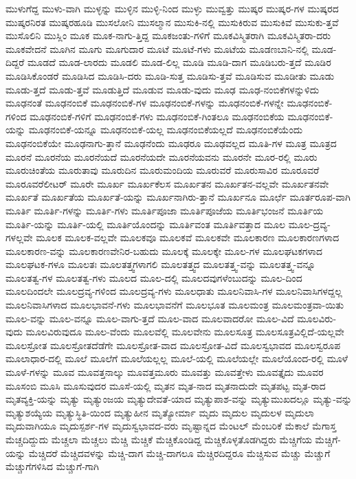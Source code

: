 {ಮುಳುಗೆದ್ದ
ಮುಳು-ವಾಗಿ
ಮುಳ್ಳನ್ನು
ಮುಳ್ಳಿನ
ಮುಳ್ಳಿ-ನಿಂದ
ಮುಳ್ಳು
ಮುವ್ವತ್ತು
ಮುಷ್ಕರ
ಮುಷ್ಕರ-ಗಳ
ಮುಷ್ಕರದ
ಮುಷ್ಕರನಿರತ
ಮುಷ್ಕರಹೂಡಿ
ಮುಸಲೋನಿ
ಮುಸಲ್ಮಾನ
ಮುಸುಕಿ-ನಲ್ಲಿ
ಮುಸುಕಿರುವ
ಮುಸುಕಿವೆ
ಮುಸುಕು-ತ್ತವೆ
ಮುಸೊಲಿನಿ
ಮುಸ್ಲಿಂ
ಮೂಕ
ಮೂಕ-ನಾಗು-ತ್ತಿದ್ದ
ಮೂಕಜಂತು-ಗಳಿಗೆ
ಮೂಕವಿಸ್ಮಿತರಾಗಿ
ಮೂಕವಿಸ್ಮಿತರಾ-ದರು
ಮೂಕವೇದನೆ
ಮೂಗಿನ
ಮೂಗು
ಮೂಗುದಾರ
ಮೂಟೆ
ಮೂಟೆ-ಗಳು
ಮೂಟೆಯ
ಮೂಡಣಬಾನಿ-ನಲ್ಲಿ
ಮೂಡ-ದಿದ್ದರೆ
ಮೂಡದೆ
ಮೂಡ-ಲಾರದು
ಮೂಡಲಿ
ಮೂಡ-ಲಿಲ್ಲ
ಮೂಡಿ
ಮೂಡಿ-ದಾಗ
ಮೂಡಿಬರು-ತ್ತದೆ
ಮೂಡಿರ
ಮೂಡಿಸಿಕೊಂಡರೆ
ಮೂಡಿಸಿದ
ಮೂಡಿಸಿ-ದರು
ಮೂಡಿ-ಸುತ್ತ
ಮೂಡಿಸು-ತ್ತವೆ
ಮೂಡಿಸುವ
ಮೂಡೀತು
ಮೂಡು
ಮೂಡು-ತ್ತದೆ
ಮೂಡು-ತ್ತವೆ
ಮೂಡುತ್ತಿದೆ
ಮೂಡುವ
ಮೂಡು-ವುದು
ಮೂಢ
ಮೂಢ-ನಂಬಿಕೆಗಳನ್ನುಳಿದು
ಮೂಢನಂತೆ
ಮೂಢನಂಬಿಕೆ
ಮೂಢನಂಬಿಕೆ-ಗಳ
ಮೂಢನಂಬಿಕೆ-ಗಳನ್ನು
ಮೂಢನಂಬಿಕೆ-ಗಳನ್ನೇ
ಮೂಢನಂಬಿಕೆ-ಗಳಿಂದ
ಮೂಢನಂಬಿಕೆ-ಗಳಿಗೆ
ಮೂಢನಂಬಿಕೆ-ಗಳು
ಮೂಢನಂಬಿಕೆ-ಗಿಂತಲೂ
ಮೂಢನಂಬಿಕೆಯ
ಮೂಢನಂಬಿಕೆ-ಯನ್ನು
ಮೂಢನಂಬಿಕೆ-ಯನ್ನೂ
ಮೂಢನಂಬಿಕೆ-ಯಲ್ಲ
ಮೂಢನಂಬಿಕೆಯಲ್ಲದೆ
ಮೂಢನಂಬಿಕೆಯೆಂದು
ಮೂಢನಂಬಿಕೆಯೇ
ಮೂಢನಾಗು-ತ್ತಾನೆ
ಮೂಢನೆಂದು
ಮೂಢರೂ
ಮೂಢವಲ್ಲದ
ಮೂತಿ-ಗಳ
ಮೂತ್ರ
ಮೂತ್ರದ
ಮೂರನೆ
ಮೂರನೆಯ
ಮೂರನೆಯದೆ
ಮೂರನೆಯದೇ
ಮೂರನೆಯವನು
ಮೂರನೇ
ಮೂರ-ರಲ್ಲಿ
ಮೂರು
ಮೂರುಚಿಂತೆಯ
ಮೂರುತಾವು
ಮೂರುದಿನ
ಮೂರುಮಂದಿಯ
ಮೂರುವರೆ
ಮೂರುಸಾವಿರ
ಮೂರೂವರೆ
ಮೂರೂವರೆಲೀಟರ್
ಮೂರೇ
ಮೂರ್ಖ
ಮೂರ್ಖಕೆಲಸ
ಮೂರ್ಖತನ
ಮೂರ್ಖತನ-ವಲ್ಲವೇ
ಮೂರ್ಖತನವೇ
ಮೂರ್ಖತೆ
ಮೂರ್ಖತೆಯ
ಮೂರ್ಖತೆ-ಯನ್ನು
ಮೂರ್ಖನಾಗಿರು-ತ್ತಾನೆ
ಮೂರ್ಖನೂ
ಮೂರ್ಛೆ
ಮೂರ್ತರೂಪ-ವಾಗಿ
ಮೂರ್ತಿ
ಮೂರ್ತಿ-ಗಳನ್ನು
ಮೂರ್ತಿ-ಗಳು
ಮೂರ್ತಿಪೂಜಾ
ಮೂರ್ತಿಪೂಜೆಯ
ಮೂರ್ತಿಭಂಜನೆ
ಮೂರ್ತಿಯ
ಮೂರ್ತಿ-ಯನ್ನು
ಮೂರ್ತಿ-ಯಲ್ಲಿ
ಮೂರ್ತಿಯೊಂದನ್ನು
ಮೂರ್ತಿವಂತ
ಮೂರ್ತಿವತ್ತಾದ
ಮೂಲ
ಮೂಲ-ದ್ರವ್ಯ-ಗಳಲ್ಲವೇ
ಮೂಲಕ
ಮೂಲಕ-ವಲ್ಲವೇ
ಮೂಲಕವೂ
ಮೂಲಕವೆ
ಮೂಲಕವೇ
ಮೂಲಕಾರಣ
ಮೂಲಕಾರಣಗಳಾದ
ಮೂಲಕಾರಣ-ವನ್ನು
ಮೂಲಕಾರಣವೇನಿರ-ಬಹುದು
ಮೂಲಕ್ಕೆ
ಮೂಲಕ್ಕೇ
ಮೂಲ-ಗಳ
ಮೂಲಘಟಕಗಳಾದ
ಮೂಲಘಟಕ-ಗಳೂ
ಮೂಲತಃ
ಮೂಲತತ್ತ್ವಗಳಾಗಲಿ
ಮೂಲತತ್ತ್ವದ
ಮೂಲತತ್ತ್ವ-ವನ್ನು
ಮೂಲತತ್ತ್ವ-ವನ್ನೂ
ಮೂಲತತ್ವ-ಗಳ
ಮೂಲತತ್ವ-ಗಳು
ಮೂಲದ
ಮೂಲ-ದಲ್ಲಿ
ಮೂಲದವುಗಳೆಂಬುದನ್ನು
ಮೂಲ-ದಿಂದ
ಮೂಲದಿಂದಲೇ
ಮೂಲದ್ರವ್ಯ-ಗಳಿಂದ
ಮೂಲದ್ರವ್ಯ-ಗಳು
ಮೂಲಧಾತು
ಮೂಲನಿವಾಸಿ-ಗಳ
ಮೂಲನಿವಾಸಿಗಳದ್ದಲ್ಲ
ಮೂಲನಿವಾಸಿಗಳಾದ
ಮೂಲಭಾವನೆ-ಗಳು
ಮೂಲಭಾವನೆಗೆ
ಮೂಲಭೂತ
ಮೂಲಮಂತ್ರ
ಮೂಲಮಂತ್ರವಾ-ಯಿತು
ಮೂಲ-ವನ್ನು
ಮೂಲ-ವನ್ನೂ
ಮೂಲ-ವಾಗು-ತ್ತದೆ
ಮೂಲ-ವಾದ
ಮೂಲವಾದರೋ
ಮೂಲ-ವಿದೆ
ಮೂಲವಿರು-ವುದು
ಮೂಲವಿರುವುದೂ
ಮೂಲ-ವೆಂದು
ಮೂಲವೆಲ್ಲಿ
ಮೂಲವೇನು
ಮೂಲಸೂತ್ರ
ಮೂಲಸೂತ್ರವಿಲ್ಲಿದೆ-ಯಲ್ಲವೇ
ಮೂಲಸ್ರೋತ
ಮೂಲಸ್ರೋತದೆಡೆಗೇ
ಮೂಲಸ್ರೋತ-ವಾದ
ಮೂಲಸ್ರೋತ-ವಿದೆ
ಮೂಲಸ್ವಭಾವದ
ಮೂಲಸ್ವರೂಪ
ಮೂಲಾಧಾರ-ದಲ್ಲಿ
ಮೂಲೆ
ಮೂಲೆಗೆ
ಮೂಲೆಯಲ್ಲಲ್ಲ
ಮೂಲೆ-ಯಲ್ಲಿ
ಮೂಲೆಯಲ್ಲೇ
ಮೂಲೆಯೊಂದ-ರಲ್ಲಿ
ಮೂಳೆ
ಮೂಳೆ-ಗಳನ್ನು
ಮೂವ
ಮೂವತ್ತನಾಲ್ಕು
ಮೂವತ್ತಮೂರು
ಮೂವತ್ತು
ಮೂವತ್ತೇಳು
ಮೂವತ್ತೈದು
ಮೂವರ
ಮೂಸಂಬಿ
ಮೂಸಿ
ಮೂಸುವುದರ
ಮೂಸೆ-ಯಲ್ಲಿ
ಮೃತನ
ಮೃತ-ನಾದ
ಮೃತನಾದುದೇ
ಮೃತಪಟ್ಟ
ಮೃತ-ರಾದ
ಮೃತವ್ಯಕ್ತಿ-ಯನ್ನು
ಮೃತ್ಯು
ಮೃತ್ಯುಂಜಯ
ಮೃತ್ಯುದೇವತೆ-ಯಾದ
ಮೃತ್ಯುಪಾಶ-ವನ್ನು
ಮೃತ್ಯುಮುಖದಲ್ಲೂ
ಮೃತ್ಯು-ವನ್ನು
ಮೃತ್ಯುಶಯ್ಯೆಯ
ಮೃತ್ಯುಸ್ಥಿತಿ-ಯಿಂದ
ಮೃತ್ಯುಹೀನ
ಮೃತ್ಯೋರ್ಮಾ
ಮೃದು
ಮೃದುಲ
ಮೃದುಲಳ
ಮೃದುಲಾ
ಮೃದುವಾಗಿಯೂ
ಮೃದುಸ್ಪರ್ಶ-ಗಳ
ಮೃದುಸ್ವಭಾವದ-ವರು
ಮೃಷ್ಟಾನ್ನದ
ಮೆಂಟಲ್
ಮೆಂಬರಿಕೆ
ಮೆಕಾಲೆ
ಮೆಗಾಸ್ತ
ಮೆಚ್ಚದಿದ್ದುದು
ಮೆಚ್ಚಲಾ
ಮೆಚ್ಚಲು
ಮೆಚ್ಚಿ
ಮೆಚ್ಚಿಕೆ
ಮೆಚ್ಚಿಕೊಂಡಿದ್ದ
ಮೆಚ್ಚಿಕೊಳ್ಳತೊಡಗಿದ್ದರು
ಮೆಚ್ಚಿಗೆಯ
ಮೆಚ್ಚಿಗೆ-ಯನ್ನು
ಮೆಚ್ಚಿದರೆ
ಮೆಚ್ಚಿದವಳನ್ನು
ಮೆಚ್ಚಿ-ದಾಗ
ಮೆಚ್ಚಿ-ದಾಗಲೂ
ಮೆಚ್ಚಿರದಿದ್ದರೂ
ಮೆಚ್ಚಿಸುವ
ಮೆಚ್ಚು
ಮೆಚ್ಚುಗೆ
ಮೆಚ್ಚುಗೆಗಳಿಸಿದ
ಮೆಚ್ಚುಗೆ-ಗಾಗಿ
}
